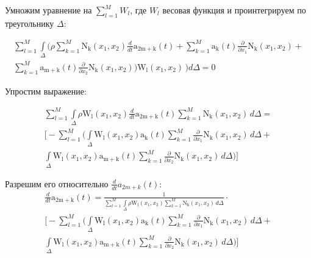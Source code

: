 \documentclass[14pt]{extreport}
\begin{document}
Умножим уравнение на $\sum\limits_{l=1}^{M} W_l$, где $W_l$ весовая функция и проинтегрируем по треугольнику $\Delta$:

\begin{multline*}
\sum_{l=1}^{M} \int\limits_{\Delta} \bigg(\rho \sum_{k=1}^{M} \operatorname{N_{k}}{ (x_{1},x_{2}  )} \frac{d}{d t} \operatorname{a_{2m+k}}{ (t  )} + \sum_{k=1}^{M} \operatorname{a_{k}}{ (t  )} \frac{\partial}{\partial x_{1}} \operatorname{N_{k}}{ (x_{1},x_{2}  )} + \\ \sum_{k=1}^{M} \operatorname{a_{m+k}}{ (t  )} \frac{\partial}{\partial x_{2}} \operatorname{N_{k}}{ (x_{1},x_{2}  )}\bigg) \operatorname{W_{l}}{ (x_{1},x_{2}  )}\, \bigg)d\Delta=0
\end{multline*}


Упростим выражение:

\begin{multline*}
\sum_{l=1}^{M} \int\limits_{\Delta} \rho \operatorname{W_{l}}{ (x_{1},x_{2}  )} \frac{d}{d t} \operatorname{a_{2m+k}}{ (t  )} \sum_{k=1}^{M} \operatorname{N_{k}}{ (x_{1},x_{2}  )}\, d\Delta = \\ \bigg [ - \sum_{l=1}^{M} \bigg(\int\limits_{\Delta} \operatorname{W_{l}}{ (x_{1},x_{2}  )} \operatorname{a_{k}}{ (t  )} \sum_{k=1}^{M} \frac{\partial}{\partial x_{1}} \operatorname{N_{k}}{ (x_{1},x_{2}  )}\, d\Delta + \\ \int\limits_{\Delta} \operatorname{W_{l}}{ (x_{1},x_{2}  )} \operatorname{a_{m+k}}{ (t  )} \sum_{k=1}^{M} \frac{\partial}{\partial x_{2}} \operatorname{N_{k}}{ (x_{1},x_{2}  )}\, d\Delta\bigg)\bigg ]
\end{multline*}

Разрешим его относительно $\frac{d}{dt}a_{2m+k}(t)$:
\begin{multline*}
\frac{d}{d t} \operatorname{a_{2m+k}}{ (t  )}= \frac{1}{\sum\limits_{l=1}^{M} \int\limits_{\Delta} \rho \operatorname{W_{l}}{ (x_{1},x_{2}  )}  \sum\limits_{k=1}^{M} \operatorname{N_{k}}{ (x_{1},x_{2}  )}\, d\Delta} \cdot \\ \bigg [ - \sum_{l=1}^{M} \bigg(\int\limits_{\Delta} \operatorname{W_{l}}{ (x_{1},x_{2}  )} \operatorname{a_{k}}{ (t  )} \sum\limits_{k=1}^{M} \frac{\partial}{\partial x_{1}} \operatorname{N_{k}}{ (x_{1},x_{2}  )}\, d\Delta + \\ \int\limits_{\Delta} \operatorname{W_{l}}{ (x_{1},x_{2}  )} \operatorname{a_{m+k}}{ (t  )} \sum_{k=1}^{M} \frac{\partial}{\partial x_{2}} \operatorname{N_{k}}{ (x_{1},x_{2}  )}\, d\Delta\bigg)\bigg ]
\end{multline*}
\end{document}
